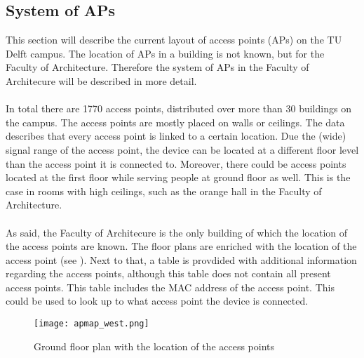 \subsection{System of APs}\label{systemofaps}
This section will describe the current layout of access points (APs) on the TU Delft campus. The location of APs in a building is not known, but for the Faculty of Architecture. Therefore the system of APs in the Faculty of Architecure will be described in more detail. \\\\
In total there are 1770 access points, distributed over more than 30 buildings on the campus. The access points are mostly placed on walls or ceilings. The data describes that every access point is linked to a certain location. Due the (wide) signal range of the access point, the device can be located at a different floor level than the access point it is connected to. Moreover, there could be access points located at the first floor while serving people at ground floor as well. This is the case in rooms with high ceilings, such as the orange hall in the Faculty of Architecture. \\\\
As said, the Faculty of Architecure is the only building of which the location of the access points are known. The floor plans are enriched with the location of the access point (see ). Next to that, a table is provdided with additional information regarding the access points, although this table does not contain all present access points. This table includes the MAC address of the access point. This could be used to look up to what access point the device is connected. 
\begin{figure}[H]
	\centering
	\texttt{[image: apmap\_west.png]}
	\captionsetup{justification=centering}
	\caption{Ground floor plan with the location of the access points}
	\label{apmap_west}
\end{figure}

